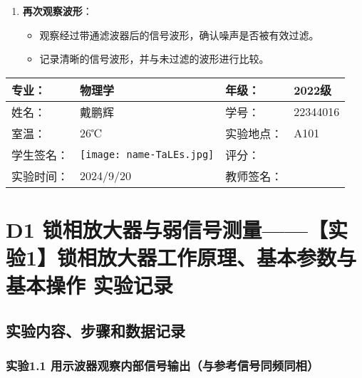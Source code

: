 \documentclass[dvipsnames, svgnames,a4paper,11pt]{article}
\begin{document}
\begin{enumerate}
		\item \textbf{再次观察波形}：
			\begin{itemize}
				\item 观察经过带通滤波器后的信号波形，确认噪声是否被有效过滤。
				\item 记录清晰的信号波形，并与未过滤的波形进行比较。
			\end{itemize}


	\end{enumerate}




\clearpage
\begin{table}
	\renewcommand\arraystretch{1.7}
	\centering
	\begin{tabularx}{\textwidth}{|X|X|X|X|}
	\hline
	专业：& 物理学 &年级：& 2022级 \\
	\hline
	姓名：& 戴鹏辉 & 学号：& 22344016 \\
	\hline
	室温：& 26℃ & 实验地点： & A101 \\
	\hline
	学生签名：& \texttt{[image: name-TaLEs.jpg]} & 评分： &\\
	\hline
	实验时间：& 2024/9/20 & 教师签名：&\\
	\hline
	\end{tabularx}
\end{table}

\section{D1 \quad 锁相放大器与弱信号测量——【实验1】锁相放大器工作原理、基本参数与基本操作 \quad\heiti 实验记录}
\subsection{实验内容、步骤和数据记录}

	\subsubsection*{实验1.1 \quad 用示波器观察内部信号输出（与参考信号同频同相）}
	
\end{document}
